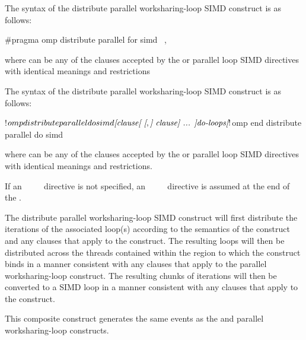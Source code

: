\syntax
\begin{ccppspecific}
The syntax of the distribute parallel worksharing-loop SIMD construct is as follows:

\begin{ompcPragma}
#pragma omp distribute parallel for simd \
            \plc{[clause[ [},\plc{] clause] ... ] newline}
\end{ompcPragma}

where  can be any of the clauses accepted by the  or parallel loop
SIMD directives with identical meanings and restrictions
\end{ccppspecific}

\begin{fortranspecific}
The syntax of the distribute parallel worksharing-loop SIMD construct is as follows:

\begin{ompfPragma}
!$omp distribute parallel do simd \plc{[clause[ [},\plc{] clause] ... ]}
    \plc{do-loops}
\plc{[}!$omp end distribute parallel do simd\plc{]}
\end{ompfPragma}

where  can be any of the clauses accepted by the  or parallel loop
SIMD directives with identical meanings and restrictions.

If an ~~~~ directive is not specified, an
\code{end}~\code{distribute}~\code{parallel}~\code{do}~\code{simd} directive is assumed at the end of the .
\end{fortranspecific}

\descr
The distribute parallel worksharing-loop SIMD construct will first distribute the iterations of the
associated loop(s) according to the semantics of the  construct and any
clauses that apply to the  construct. The resulting loops will then be
distributed across the threads contained within the \code{teams} region to which the
\code{distribute} construct binds in a manner consistent with any clauses that apply to the
parallel worksharing-loop construct. The resulting chunks of iterations will then be converted to a
SIMD loop in a manner consistent with any clauses that apply to the \code{simd} construct.

\events

This composite construct generates the same events as the  and parallel worksharing-loop constructs.

